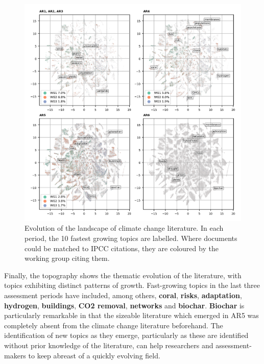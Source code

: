 \documentclass{article}
\begin{document}
\begin{linenumbers}
		
		\begin{figure}
			\begin{center}
				\includegraphics[width=180mm]{plots_pub/topic_evolution_4.png}
				\caption{Evolution of the landscape of climate change literature. In each period, the 10 fastest growing topics are labelled. Where documents could be matched to IPCC citations, they are coloured by the working group citing them.}
				\label{evolution-map}
			\end{center}
		\end{figure}
		
		Finally, the topography shows the thematic evolution of the literature, with topics exhibiting distinct patterns of growth. Fast-growing topics in the last three assessment periods have included, among others, \textbf{coral}, \textbf{risks}, \textbf{adaptation}, \textbf{hydrogen}, \textbf{buildings}, \textbf{CO2 removal}, \textbf{networks} and \textbf{biochar}. \textbf{Biochar} is particularly remarkable in that the sizeable literature which emerged in AR5 was completely absent from the climate change literature beforehand. 
		The identification of new topics as they emerge, particularly as these are identified without prior knowledge of the literature, can help researchers and assessment-makers to keep abreast of a quickly evolving field.
		

\end{linenumbers}
\end{document}
